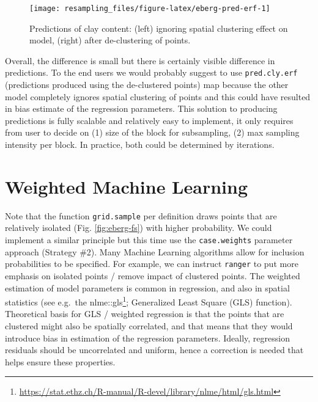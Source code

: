 \documentclass[
  graybox,natbib,nospthms]{svmono}
\newenvironment{Shaded}{\begin{snugshade}}{\end{snugshade}}
\newcommand{\AttributeTok}[1]{\textcolor[rgb]{0.61,0.61,0.61}{#1}}
\newcommand{\CommentTok}[1]{\textcolor[rgb]{0.37,0.37,0.37}{\textit{#1}}}
\newcommand{\DecValTok}[1]{\textcolor[rgb]{0.06,0.06,0.06}{#1}}
\newcommand{\FunctionTok}[1]{\textcolor[rgb]{0,0,0}{#1}}
\newcommand{\NormalTok}[1]{#1}
\newcommand{\StringTok}[1]{\textcolor[rgb]{0.5,0.5,0.5}{#1}}
\renewcommand{\href}[2]{#2 (\url{#1})}
\renewcommand{\href}[2]{#2\footnote{\url{#1}}}
\begin{document}
\begin{Shaded}
\end{Shaded}

\begin{figure}

{\centering \texttt{[image: resampling\_files/figure-latex/eberg-pred-erf-1]} 

}

\caption{Predictions of clay content: (left) ignoring spatial clustering effect on model, (right) after de-clustering of points.}\label{fig:eberg-pred-erf}
\end{figure}

Overall, the difference is small but there is certainly visible difference in predictions.
To the end users we would probably suggest to use \texttt{pred.cly.erf} (predictions produced
using the de-clustered points) map because the other model completely ignores
spatial clustering of points and this could have resulted in bias estimate of the
regression parameters. This solution to producing predictions is fully scalable
and relatively easy to implement, it only requires from user to decide on (1)
size of the block for subsampling, (2) max sampling intensity per block. In practice,
both could be determined by iterations.

\hypertarget{weighted-machine-learning}{%
\section{Weighted Machine Learning}\label{weighted-machine-learning}}

Note that the function \texttt{grid.sample} per definition draws points that are relatively
isolated (Fig. \ref{fig:eberg-fs}) with higher probability. We could implement a similar
principle but this time use the \texttt{case.weights} parameter approach (Strategy \#2). Many
Machine Learning algorithms allow for inclusion probabilities to be specified. For
example, we can instruct \texttt{ranger} to put more emphasis on isolated points / remove impact of
clustered points. The weighted estimation of model parameters is common in regression,
and also in spatial statistics (see e.g.~the \href{https://stat.ethz.ch/R-manual/R-devel/library/nlme/html/gls.html}{nlme::gls}; Generalized Least Square (GLS) function).
Theoretical basis for GLS / weighted regression is that the points that are clustered
might also be spatially correlated, and that means that they would introduce bias in
estimation of the regression parameters. Ideally, regression residuals should be
uncorrelated and uniform, hence a correction is needed that helps ensure these properties.
\end{document}
